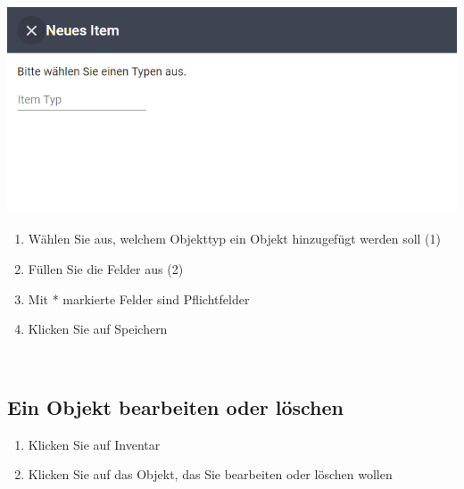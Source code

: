 \documentclass[11pt,a4paper]{report}
\begin{document}
	\begin{minipage}{0.4\linewidth}
	\includegraphics[scale=0.55]{Inventar.png}
	\end{minipage}
	\hfill
	\begin{minipage}{0.4\linewidth}
	\begin{enumerate}[3]
		\item Wählen Sie aus, welchem Objekttyp ein Objekt hinzugefügt werden soll (1)
		\item Füllen Sie die Felder aus (2)
		\item[] Mit * markierte Felder sind Pflichtfelder
		\item Klicken Sie auf Speichern
	\end{enumerate}
	\end{minipage}\\

	\subsection{Ein Objekt bearbeiten oder löschen}

	\begin{enumerate}
		\item Klicken Sie auf \glqq{}Inventar\grqq{}
		\item Klicken Sie auf das Objekt, das Sie bearbeiten oder löschen wollen
	\end{enumerate}\\
\end{document}
